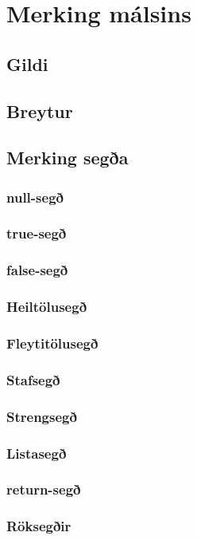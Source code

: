 \documentclass[12pt,a4paper]{article}
\begin{document}
\section{Merking málsins}
\subsection{Gildi}
\subsection{Breytur}
\subsection{Merking segða}
\subsubsection{null-segð}
\subsubsection{true-segð}
\subsubsection{false-segð}
\subsubsection{Heiltölusegð}
\subsubsection{Fleytitölusegð}
\subsubsection{Stafsegð}
\subsubsection{Strengsegð}
\subsubsection{Listasegð}
\subsubsection{return-segð}
\subsubsection{Röksegðir}
\end{document}
